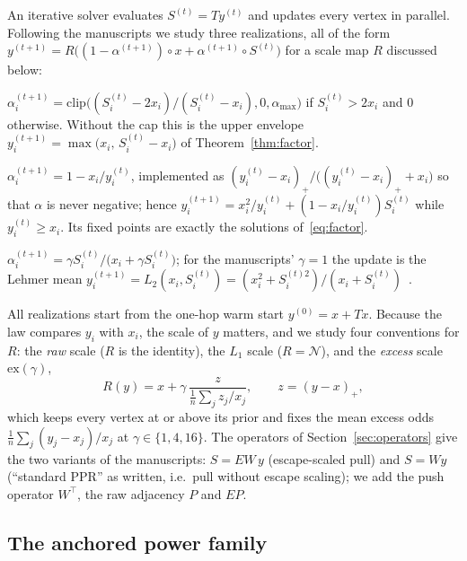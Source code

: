 \documentclass[11pt,a4paper]{article}
\theoremstyle{definition}
\theoremstyle{plain}
\newcommand{\clip}{\mathrm{clip}}
\newcommand{\N}{\mathcal{N}}
\begin{document}
An iterative solver evaluates $S^{(t)}=Ty^{(t)}$ and updates every vertex in parallel. Following the manuscripts we study three realizations, all of the form $y^{(t+1)}=R\big((1-\alpha^{(t+1)})\circ x+\alpha^{(t+1)}\circ S^{(t)}\big)$ for a scale map $R$ discussed below:
\begin{description}[leftmargin=1.2em,style=nextline]
\item[Realization A (simultaneous root).] $\alpha_i^{(t+1)}=\clip\big((S_i^{(t)}-2x_i)/(S_i^{(t)}-x_i),0,\alpha_{\max}\big)$ if $S_i^{(t)}>2x_i$ and $0$ otherwise. Without the cap this is the upper envelope $y_i^{(t+1)}=\max\big(x_i,\,S_i^{(t)}-x_i\big)$ of Theorem~\ref{thm:factor}.
\item[Realization B (time-lagged).] $\alpha_i^{(t+1)}=1-x_i/y_i^{(t)}$, implemented as $(y_i^{(t)}-x_i)_+/\big((y_i^{(t)}-x_i)_++x_i\big)$ so that $\alpha$ is never negative; hence $y_i^{(t+1)}=x_i^2/y_i^{(t)}+(1-x_i/y_i^{(t)})S_i^{(t)}$ while $y_i^{(t)}\ge x_i$. Its fixed points are exactly the solutions of~\eqref{eq:factor}.
\item[Realization C (direct neighbour signal).] $\alpha_i^{(t+1)}=\gamma S_i^{(t)}/\big(x_i+\gamma S_i^{(t)}\big)$; for the manuscripts' $\gamma=1$ the update is the Lehmer mean $y_i^{(t+1)}=L_2(x_i,S_i^{(t)})=(x_i^2+S_i^{(t)2})/(x_i+S_i^{(t)})$~\cite{lehmer71}.
\end{description}
All realizations start from the one-hop warm start $y^{(0)}=x+Tx$. Because the law compares $y_i$ with $x_i$, the scale of $y$ matters, and we study four conventions for $R$: the \emph{raw} scale ($R$ is the identity), the \emph{$L_1$} scale ($R=\N$), and the \emph{excess} scale $\mathrm{ex}(\gamma)$,
\begin{equation}\label{eq:excess}
R(y)=x+\gamma\,\frac{z}{\tfrac1n\sum_jz_j/x_j},\qquad z=(y-x)_+,
\end{equation}
which keeps every vertex at or above its prior and fixes the mean excess odds $\tfrac1n\sum_j(y_j-x_j)/x_j$ at $\gamma\in\{1,4,16\}$. The operators of Section~\ref{sec:operators} give the two variants of the manuscripts: $S=EW\,y$ (escape-scaled pull) and $S=Wy$ (``standard PPR'' as written, i.e.\ pull without escape scaling); we add the push operator $W^{\top}$, the raw adjacency $P$ and $EP$.

\subsection{The anchored power family}\label{sec:ap}
\end{document}

